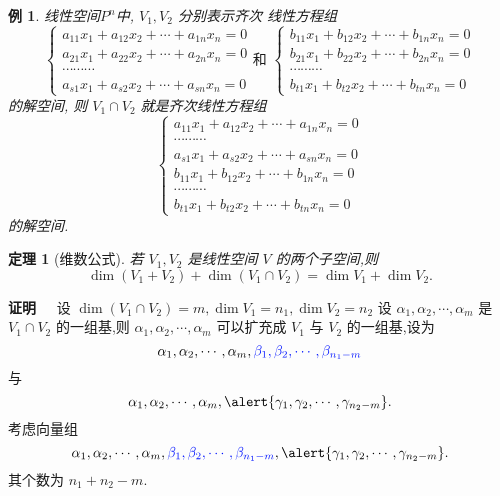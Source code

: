 \documentclass[13pt]{beamer}
\newtheorem{thm}{定理}
\newtheorem{exa}{例}
\def\pf{{\bf 证明~~ }}
\def\0{\mathbf{0}}
\newcommand{\blue}{\textcolor{blue}}
\begin{document}
\begin{frame}
\begin{exa}
\small{
线性空间$P^n$中, $V_{1}, V_{2}$ 分别表示齐次 线性方程组 
$$\left\{\begin{array}{c}
a_{11} x_{1}+a_{12} x_{2}+\cdots +a_{1 n} x_{n}=0 \\
a_{21} x_{1}+a_{22} x_{2}+\cdots +a_{2 n} x_{n}=0 \\
  \cdots \cdots  \cdots\\ 
a_{s 1} x_{1}+a_{s 2} x_{2}+\cdots +a_{s n} x_{n}=0
\end{array}\right.
\mbox{和}\,\,
\left\{\begin{array}{c}
b_{11} x_{1}+b_{12} x_{2}+\cdots +b_{1 n} x_{n}=0 \\ 
b_{21} x_{1}+b_{22} x_{2}+\cdots +b_{2 n} x_{n}=0 \\ 
\cdots \cdots \cdots \\ 
b_{t1} x_{1}+b_{t2} x_{2}+\cdots +b_{t n} x_{n}= 0 
\end{array}\right.$$
的解空间, 
则 $V_{1} \cap V_{2}$ 就是齐次线性方程组 
$$\left\{
\begin{array}{c}
a_{11} x_{1}+a_{12} x_{2}+  \cdots +a_{1 n} x_{n}=0\\
\cdots \cdots \cdots\\ 
a_{s 1} x_{1}+a_{s 2} x_{2}+  \cdots +a_{s n} x_{n}=0\\
b_{11} x_{1}+b_{12} x_{2}+  \cdots +b_{1 n} x_{n}=0 \\ 
\cdots \cdots \cdots \\ 
b_{t 1} x_{1}+b_{t 2} x_{2}+ \cdots +b_{t n} x_{n}=0
\end{array}
\right.$$
的解空间.}
\end{exa}
\end{frame}


\begin{frame}
\setcounter{thm}{6}
\begin{thm}[维数公式]
若 $V_{1}, V_{2}$ 是线性空间 $V$ 的两个子空间,则 $$\operatorname{dim}\left(V_{1}+V_{2}\right)+\operatorname{dim}\left(V_{1} \cap V_{2}\right)=\operatorname{dim} V_{1}+\operatorname{dim} V_{2}.$$
\end{thm}


\pf 
设 $\operatorname{dim}\left(V_{1} \cap V_{2}\right)=m, \operatorname{dim} V_{1}=n_{1}, \operatorname{dim} V_{2}=n_{2}$
设 $\alpha_{1}, \alpha_{2}, \cdots, \alpha_{m}$ 是 $V_{1} \cap V_{2}$ 的一组基,则 $\alpha_{1}, \alpha_{2}, \cdots, \alpha_{m}$ 可以扩充成 $V_{1}$ 与 $V_{2}$ 的一组基,设为
$$\alpha_{1}, \alpha_{2}, \cdots, \alpha_{m},  \blue{\beta_{1}, \beta_{2}, \cdots, \beta_{n_{1}-m}}$$ 与 $$\alpha_{1}, \alpha_{2}, \cdots, \alpha_{m}, \alert{\gamma_{1}, \gamma_{2}, \cdots, \gamma_{n_{2}-m}}.$$
考虑向量组 $$\alpha_{1}, \alpha_{2}, \cdots, \alpha_{m}, \blue{\beta_{1}, \beta_{2}, \cdots, \beta_{n_{1}-m}}, \alert{\gamma_{1}, \gamma_{2}, \cdots, \gamma_{n_{2}-m}}.$$ 其个数为 $n_{1}+n_{2}-m$.
\end{frame}
\end{document}
